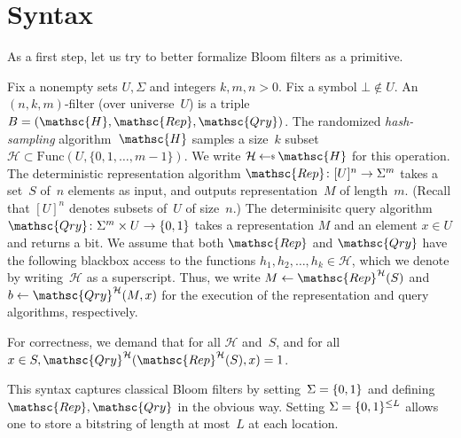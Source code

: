 \section{Syntax}
As a first step, let us try to better formalize Bloom filters as a primitive.

Fix a nonempty sets $U,\Sigma$ and integers $k,m,n>0$.  Fix a symbol $\bot \not\in U$.  An $(n,k,m)$-filter (over universe~$U$) is a triple  $B=(\mathsc{H},\mathsc{Rep},\mathsc{Qry})$.   
%
The randomized \emph{hash-sampling} algorithm~$\mathsc{H}$ samples a size~$k$ subset~$\mathcal{H} \subset \mathrm{Func}(U,\{0,1,\ldots,m-1\})$.  We write $\mathcal{H} \getsr \mathsc{H}$ for this operation.
%
The deterministic representation algorithm $\mathsc{Rep}\colon [U]^n \rightarrow \Sigma^m$ takes a set~$S$ of~$n$ elements as input, and outputs representation~$M$ of length~$m$.  (Recall that $[U]^n$ denotes subsets of~$U$ of size~$n$.)
%
The determinisitc query algorithm $\mathsc{Qry}\colon \Sigma^m \times U \rightarrow \bits$ takes a representation $M$ and an element $x \in U$ and returns a bit.  
%
We assume that both $\mathsc{Rep}$ and $\mathsc{Qry}$ have the following blackbox access to the functions $h_1,h_2,\ldots,h_k \in \mathcal{H}$, which we denote by writing~$\mathcal{H}$ as a superscript.   Thus, we write $M \gets \mathsc{Rep}^{\mathcal{H}}(S)$ and $b \gets \mathsc{Qry}^{\mathcal{H}}(M,x)$ for the execution of the representation and query algorithms, respectively.

For correctness, we demand that for all $\mathcal{H}$ and~$S$, and for all $x \in S, \mathsc{Qry}^{\mathcal{H}}(\mathsc{Rep}^{\mathcal{H}}(S),x)=1$.  

This syntax captures classical Bloom filters by setting~$\Sigma=\{0,1\}$ and defining $\mathsc{Rep},\mathsc{Qry}$ in the obvious way.  Setting $\Sigma=\{0,1\}^{\leq L}$ allows one to store a bitstring of length at most~$L$ at each location. 


